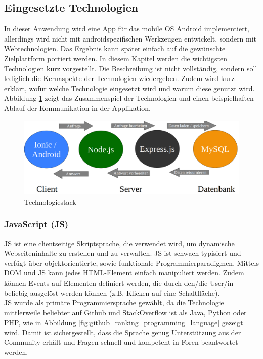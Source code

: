 \subsection{Eingesetzte Technologien} \label{sec:technologies}
In dieser Anwendung wird eine App für das mobile \ac{OS} Android implementiert, allerdings wird nicht mit androidspezifischen Werkzeugen entwickelt, sondern mit Webtechnologien. Das Ergebnis kann später einfach auf die gewünschte Zielplattform portiert werden. In diesem Kapitel werden die wichtigsten Technologien kurz vorgestellt. Die Beschreibung ist nicht vollständig, sondern soll lediglich die Kernaspekte der Technologien wiedergeben. Zudem wird kurz erklärt, wofür welche Technologie eingesetzt wird und warum diese genutzt wird. Abbildung \ref{fig:technology_stack} zeigt das Zusammenspiel der Technologien und einen beispielhaften Ablauf der Kommunikation in der Applikation.

\begin{figure}[h]
	\includegraphics[width=1\linewidth]{figures/development/technologies/technologien}
	\caption{Technologiestack}
	\label{fig:technology_stack}
\end{figure}

\subsubsection{JavaScript (JS)} \label{tec:javascript}
\ac{JS} ist eine clientseitige Skriptsprache, die verwendet wird, um dynamische Webseiteninhalte zu erstellen und zu verwalten. \ac{JS} ist schwach typisiert und verfügt über objektorientierte, sowie funktionale Programmierparadigmen. Mittels \ac{DOM} und \ac{JS} kann jedes \acs{HTML}-Element einfach manipuliert werden. Zudem können Events auf Elementen definiert werden, die durch den/die User/in beliebig ausgelöst werden können (z.B. Klicken auf eine Schaltfläche). \cite{morris:javascript:2019} \\
\ac{JS} wurde als primäre Programmiersprache gewählt, da die Technologie mittlerweile beliebter auf \href{https://github.com/}{Github} und \href{https://stackoverflow.com/}{StackOverflow} ist als Java, Python oder PHP, wie in Abbildung \ref{fig:github_ranking_programming_language} gezeigt wird. Damit ist sichergestellt, dass die Sprache genug Unterstützung aus der Community erhält und Fragen schnell und kompetent in Foren beantwortet werden.

